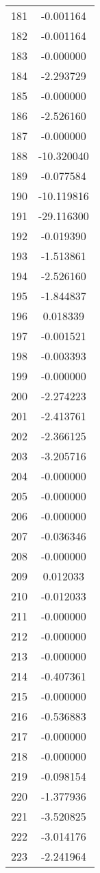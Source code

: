 \documentclass[12pt]{article}
\begin{document}
\begin{longtable}{@{}cc@{}}
181 & -0.001164 \\
182 & -0.001164 \\
183 & -0.000000 \\
184 & -2.293729 \\
185 & -0.000000 \\
186 & -2.526160 \\
187 & -0.000000 \\
188 & -10.320040 \\
189 & -0.077584 \\
190 & -10.119816 \\
191 & -29.116300 \\
192 & -0.019390 \\
193 & -1.513861 \\
194 & -2.526160 \\
195 & -1.844837 \\
196 & 0.018339 \\
197 & -0.001521 \\
198 & -0.003393 \\
199 & -0.000000 \\
200 & -2.274223 \\
201 & -2.413761 \\
202 & -2.366125 \\
203 & -3.205716 \\
204 & -0.000000 \\
205 & -0.000000 \\
206 & -0.000000 \\
207 & -0.036346 \\
208 & -0.000000 \\
209 & 0.012033 \\
210 & -0.012033 \\
211 & -0.000000 \\
212 & -0.000000 \\
213 & -0.000000 \\
214 & -0.407361 \\
215 & -0.000000 \\
216 & -0.536883 \\
217 & -0.000000 \\
218 & -0.000000 \\
219 & -0.098154 \\
220 & -1.377936 \\
221 & -3.520825 \\
222 & -3.014176 \\
223 & -2.241964 \\

\end{longtable}
\end{document}
